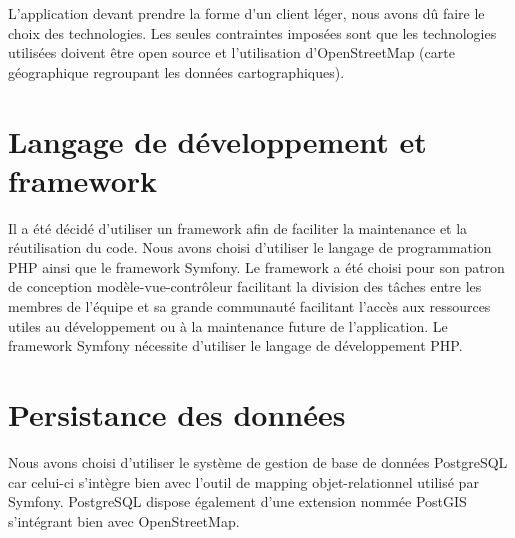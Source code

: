 

L'application devant prendre la forme d'un client léger, nous avons dû faire le choix des technologies. Les seules contraintes imposées sont que les technologies utilisées doivent être open source et l'utilisation d'OpenStreetMap (carte géographique regroupant les données cartographiques).

\section{Langage de développement et framework}
Il a été décidé d'utiliser un framework afin de faciliter la maintenance et la réutilisation du code.
Nous avons choisi d'utiliser le langage de programmation PHP ainsi que le framework Symfony. Le framework a été choisi pour son patron de conception modèle-vue-contrôleur facilitant la division des tâches entre les membres de l'équipe et sa grande communauté facilitant l'accès aux ressources utiles au développement ou à la maintenance future de l'application.
Le framework Symfony nécessite d'utiliser le langage de développement PHP. 

\section{Persistance des données}
Nous avons choisi d'utiliser le système de gestion de base de données PostgreSQL car celui-ci s'intègre bien avec l'outil de mapping objet-relationnel utilisé par Symfony. PostgreSQL dispose également d'une extension nommée PostGIS s'intégrant bien avec OpenStreetMap.